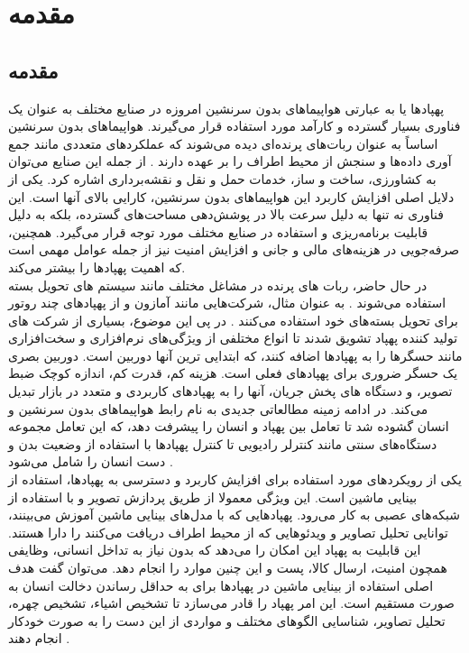 \chapter{مقدمه}
\section{مقدمه}
پهپاد‌ها یا به عبارتی هواپیماهای بدون سرنشین امروزه در صنایع مختلف به عنوان یک فناوری
 ‌بسیار گسترده و کارآمد مورد استفاده قرار می‌گیرند. هواپیماهای بدون سرنشین اساساً به عنوان ربات‌های پرنده‌ای
 دیده می‌شوند که عملکردهای متعددی مانند جمع آوری داده‌ها و سنجش از محیط اطراف را بر عهده دارند \cite{waltergesture}.
 از جمله این صنایع می‌توان به کشاورزی، ساخت و ساز، خدمات حمل و نقل و نقشه‌برداری اشاره کرد. یکی از دلایل
 اصلی افزایش کاربرد این هواپیما‌های بدون سرنشین، کارایی بالای آنها است. این فناوری نه تنها به دلیل سرعت بالا در پوشش‌دهی
 مساحت‌های گسترده، بلکه به دلیل قابلیت برنامه‌ریزی و استفاده در صنایع مختلف مورد توجه قرار می‌گیرد.
 همچنین، صرفه‌جویی در هزینه‌های مالی و جانی و افزایش امنیت نیز از جمله عوامل مهمی است که اهمیت پهپادها را بیشتر می‌کند\cite{puri2017agriculture}.
 \\
 در حال حاضر، ربات های پرنده در مشاغل مختلف مانند سیستم های تحویل بسته استفاده می‌شوند \cite{gatteschi2015new}. به عنوان مثال، شرکت‌هایی مانند آمازون و 
  از پهپادهای چند روتور برای تحویل بسته‌های خود استفاده می‌کنند \cite{moore2014nypd}. 
 در پی این موضوع، بسیاری از شرکت های تولید کننده
  پهپاد تشویق شدند تا انواع مختلفی از ویژگی‌های نرم‌افزاری و سخت‌افزاری
 مانند حسگرها را به پهپاد‌ها اضافه کنند، که ابتدایی ترین
  آنها دوربین است. دوربین بصری یک حسگر ضروری برای پهپادهای فعلی
  است. هزینه کم، قدرت کم، اندازه کوچک ضبط تصویر، و دستگاه های پخش جریان، آنها را به پهپادهای کاربردی و متعدد در بازار تبدیل می‌کند\cite{natarajan2018hand}. در ادامه زمینه مطالعاتی جدیدی به نام رابط هواپیماهای بدون سرنشین و
   انسان گشوده شد تا تعامل بین پهپاد و 
 انسان را پیشرفت دهد، که این تعامل مجموعه‌ دستگاه‌های سنتی مانند کنترلر رادیویی تا کنترل پهپادها با استفاده از وضعیت بدن و دست انسان را شامل می‌شود \cite{hadri2018hand}.
 \\
 یکی از رویکردهای مورد استفاده برای افزایش کاربرد و دسترسی به پهپادها، استفاده از بینایی ماشین است. این ویژگی معمولا از طریق پردازش تصویر
 و با استفاده از شبکه‌های عصبی به کار می‌رود. پهپاد‌هایی که با مدل‌های بینایی ماشین آموزش می‌بینند، توانایی تحلیل تصاویر و ویدئو‌هایی که از محیط اطراف
 دریافت می‌کنند را دارا هستند. این قابلیت به پهپاد این امکان را می‌دهد که بدون نیاز به تداخل انسانی، وظایفی همچون امنیت، ارسال کالا، پست و این چنین موارد را انجام دهد\cite{zhu2018vision}.
 می‌توان گفت هدف اصلی استفاده از بینایی ماشین در پهپاد‌ها برای به حداقل رساندن دخالت انسان به صورت مستقیم است. این
 امر پهپاد را قادر می‌سازد تا تشخیص اشیاء، تشخیص چهره، تحلیل تصاویر، شناسایی الگوهای مختلف و مواردی از این دست را به صورت خودکار انجام دهند \cite{guvenc2018detection}.

